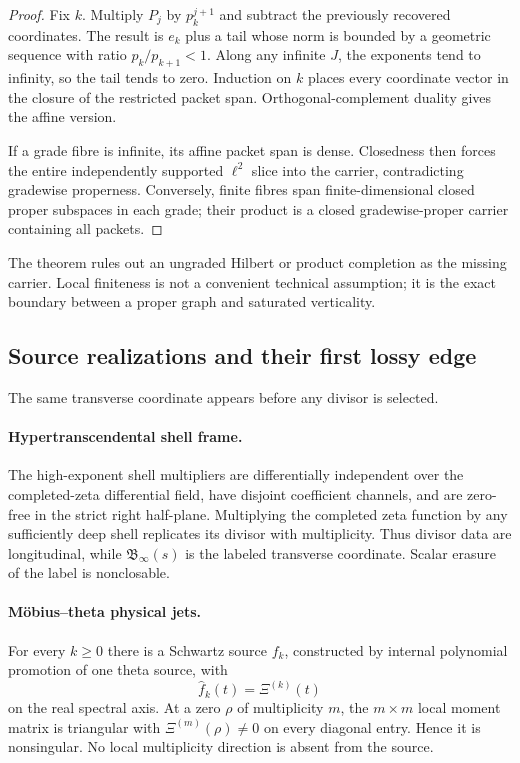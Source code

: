 \documentclass[11pt]{article}
\theoremstyle{definition}
\theoremstyle{remark}
\begin{document}
\begin{proof}
Fix \(k\).  Multiply \(P_j\) by \(p_k^{j+1}\) and subtract the previously
recovered coordinates.  The result is \(e_k\) plus a tail whose norm is
bounded by a geometric sequence with ratio
\(p_k/p_{k+1}<1\).  Along any infinite \(J\), the exponents tend to
infinity, so the tail tends to zero.  Induction on \(k\) places every
coordinate vector in the closure of the restricted packet span.
Orthogonal-complement duality gives the affine version.

If a grade fibre is infinite, its affine packet span is dense.  Closedness
then forces the entire independently supported \(\ell^2\) slice into the
carrier, contradicting gradewise properness.  Conversely, finite fibres
span finite-dimensional closed proper subspaces in each grade; their
product is a closed gradewise-proper carrier containing all packets.
\end{proof}

The theorem rules out an ungraded Hilbert or product completion as the
missing carrier.  Local finiteness is not a convenient technical
assumption; it is the exact boundary between a proper graph and saturated
verticality.

\subsection{Source realizations and their first lossy edge}

The same transverse coordinate appears before any divisor is selected.

\paragraph{Hypertranscendental shell frame.}
The high-exponent shell multipliers are differentially independent over
the completed-zeta differential field, have disjoint coefficient
channels, and are zero-free in the strict right half-plane.  Multiplying
the completed zeta function by any sufficiently deep shell replicates its
divisor with multiplicity.  Thus divisor data are longitudinal, while
\(\mathfrak B_\infty(s)\) is the labeled transverse coordinate.  Scalar
erasure of the label is nonclosable.

\paragraph{M\"obius--theta physical jets.}
For every \(k\ge0\) there is a Schwartz source \(f_k\), constructed by
internal polynomial promotion of one theta source, with
\[
                         \widehat f_k(t)=\Xi^{(k)}(t)
\tag{3.6}\label{eq:theta-landing}
\]
on the real spectral axis.  At a zero \(\rho\) of multiplicity \(m\),
the \(m\times m\) local moment matrix is triangular with
\(\Xi^{(m)}(\rho)\ne0\) on every diagonal entry.  Hence it is nonsingular.
No local multiplicity direction is absent from the source.
\end{document}
